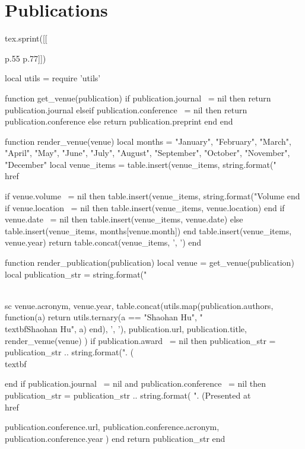 \section{\sc Publications}

\begin{luacode*}
tex.sprint([[\begin{longtabu}{p{.55\sectionwidth} p{.77\resumewidth}}]])

local utils = require 'utils'

function get_venue(publication)
    if publication.journal ~= nil then
        return publication.journal
    elseif publication.conference ~= nil then
        return publication.conference
    else
        return publication.preprint
    end
end

function render_venue(venue)
    local months = {"January", "February", "March", "April", "May", "June", "July", "August", "September", "October", "November", "December"}
    local venue_items = {}
    table.insert(venue_items, string.format("\\href{%s}{\\textsf{%
    if venue.volume ~= nil then
        table.insert(venue_items, string.format("Volume %
    end
    if venue.location ~= nil then
        table.insert(venue_items, venue.location)
    end
    if venue.date ~= nil then
        table.insert(venue_items, venue.date)
    else
        table.insert(venue_items, months[venue.month])
    end
    table.insert(venue_items, venue.year)
    return table.concat(venue_items, ', ')
end

function render_publication(publication)
    local venue = get_venue(publication)
    local publication_str = string.format("{\\sc %
        venue.acronym,
        venue.year,
        table.concat(utils.map(publication.authors, function(a) return utils.ternary(a == "Shaohan Hu", "\\textbf{Shaohan Hu}", a) end), ', '),
        publication.url,
        publication.title,
        render_venue(venue)
    )
    if publication.award ~= nil then
        publication_str = publication_str .. string.format(". (\\textbf{%
    end
    if publication.journal ~= nil and publication.conference ~= nil then
        publication_str = publication_str .. string.format(
            ". (Presented at \\href{%s}{\\textsf{\\sc %
            publication.conference.url,
            publication.conference.acronym,
            publication.conference.year
        )
    end
    return publication_str
end

}}}}
\end{longtabu}
\end{luacode*}
